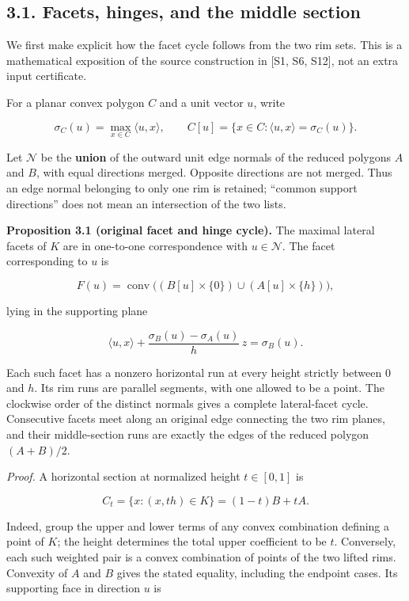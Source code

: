 \documentclass[
  11pt,
  letterpaper,
]{article}
\begin{document}
\subsection{3.1. Facets, hinges, and the middle
section}\label{facets-hinges-and-the-middle-section}

We first make explicit how the facet cycle follows from the two rim
sets. This is a mathematical exposition of the source construction in
{[}S1, S6, S12{]}, not an extra input certificate.

For a planar convex polygon \(C\) and a unit vector \(u\), write

\[
\sigma_C(u)=\max_{x\in C}\langle u,x\rangle,
\qquad C[u]=\{x\in C:\langle u,x\rangle=\sigma_C(u)\}.
\]

Let \(\mathcal N\) be the \textbf{union} of the outward unit edge
normals of the reduced polygons \(A\) and \(B\), with equal directions
merged. Opposite directions are not merged. Thus an edge normal
belonging to only one rim is retained; ``common support directions''
does not mean an intersection of the two lists.

\textbf{Proposition 3.1 (original facet and hinge cycle).} The maximal
lateral facets of \(K\) are in one-to-one correspondence with
\(u\in\mathcal N\). The facet corresponding to \(u\) is

\[
F(u)=\operatorname{conv}\bigl((B[u]\times\{0\})\cup(A[u]\times\{h\})\bigr),
\]

lying in the supporting plane

\[
\langle u,x\rangle+\frac{\sigma_B(u)-\sigma_A(u)}{h}\,z=\sigma_B(u).
\]

Each such facet has a nonzero horizontal run at every height strictly
between \(0\) and \(h\). Its rim runs are parallel segments, with one
allowed to be a point. The clockwise order of the distinct normals gives
a complete lateral-facet cycle. Consecutive facets meet along an
original edge connecting the two rim planes, and their middle-section
runs are exactly the edges of the reduced polygon \((A+B)/2\).

\emph{Proof.} A horizontal section at normalized height \(t\in[0,1]\) is

\[
C_t=\{x:(x,th)\in K\}=(1-t)B+tA.
\]

Indeed, group the upper and lower terms of any convex combination
defining a point of \(K\); the height determines the total upper
coefficient to be \(t\). Conversely, each such weighted pair is a convex
combination of points of the two lifted rims. Convexity of \(A\) and
\(B\) gives the stated equality, including the endpoint cases. Its
supporting face in direction \(u\) is
\end{document}
